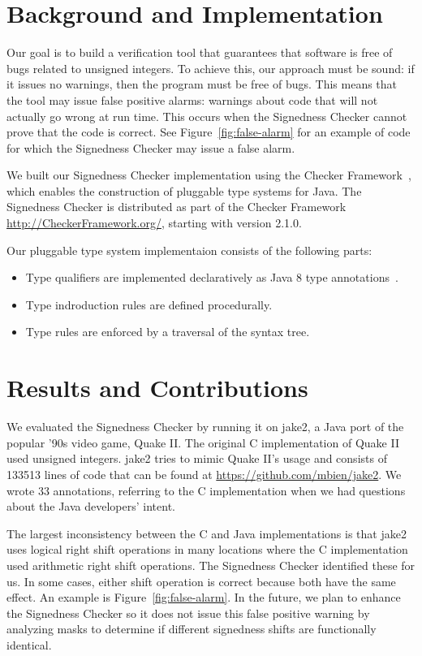 \documentclass{sig-alternate-05-2015}
\begin{document}
\section{Background and Implementation}

Our goal is to build a verification tool that guarantees that software is
free of bugs related to unsigned integers. To achieve this, our approach
must be sound:  if it issues no warnings, then the program must be free of
bugs.
This means that the tool may issue false positive alarms:  warnings about
code that will not actually go wrong at run time.  This occurs when the
Signedness Checker cannot prove that the code is correct. See Figure~\ref{fig:false-alarm}
for an example of code for which the Signedness Checker may issue a false alarm.

We built our Signedness Checker implementation using the
Checker Framework~\cite{PapiACPE2008,DietlDEMS2011}, which enables the
construction of pluggable type systems for Java.
The Signedness Checker is distributed as part of the Checker Framework
\url{http://CheckerFramework.org/}, starting with version 2.1.0.

Our pluggable type system implementaion consists of the following parts:

\begin{itemize}\itemsep 0pt \parskip 0pt
  \item Type qualifiers are implemented declaratively as Java 8 type
    annotations~\cite{JSR308-PFD}.
  \item Type indroduction rules are defined procedurally.
  \item Type rules are enforced by a traversal of the syntax tree.
\end{itemize}

\section{Results and Contributions}

We evaluated the Signedness Checker by running it on jake2, a Java
port of the popular '90s video game, Quake II\@.  The original C
implementation of Quake II used unsigned integers. jake2
tries to mimic Quake II's usage and consists of 133513 lines of code that
can be found at \url{https://github.com/mbien/jake2}.
We wrote 33 annotations, referring to the
C implementation when we had questions about the Java developers' intent.

The largest inconsistency between the C and Java implementations is that
jake2 uses logical right shift operations
in many locations where the C implementation used arithmetic right shift
operations.  The Signedness Checker identified these for us.
In some cases, either shift operation is correct because both have the same
effect.  An example is Figure~\ref{fig:false-alarm}.  In the future, we
plan to enhance the Signedness Checker so it does not issue this false
positive warning by analyzing masks to determine if different signedness shifts
are functionally identical.
\end{document}
